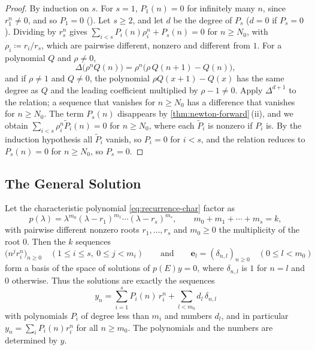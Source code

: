 \begin{proof}
By induction on $s$. For $s=1$, $P_1(n)=0$ for infinitely many $n$, since $r_1^n\ne0$, and so $P_1=0$ (). Let $s\ge2$, and let $d$ be the degree of $P_s$ ($d=0$ if $P_s=0$). Dividing by $r_s^n$ gives $\sum_{i<s}P_i(n)\rho_i^n+P_s(n)=0$ for $n\ge N_0$, with $\rho_i\coloneqq r_i/r_s$, which are pairwise different, nonzero and different from $1$. For a polynomial $Q$ and $\rho\ne0$,
\[
\Delta\bigl(\rho^nQ(n)\bigr)=\rho^n\bigl(\rho\,Q(n+1)-Q(n)\bigr),
\]
and if $\rho\ne1$ and $Q\ne0$, the polynomial $\rho Q(x+1)-Q(x)$ has the same degree as $Q$ and the leading coefficient multiplied by $\rho-1\ne0$. Apply $\Delta^{d+1}$ to the relation; a sequence that vanishes for $n\ge N_0$ has a difference that vanishes for $n\ge N_0$. The term $P_s(n)$ disappears by \cref{thm:newton-forward}\,(ii), and we obtain $\sum_{i<s}\rho_i^n\tilde P_i(n)=0$ for $n\ge N_0$, where each $\tilde P_i$ is nonzero if $P_i$ is. By the induction hypothesis all $\tilde P_i$ vanish, so $P_i=0$ for $i<s$, and the relation reduces to $P_s(n)=0$ for $n\ge N_0$, so $P_s=0$.
\end{proof}

\subsection{The General Solution}

\begin{theorem}
\label{thm:constant-coefficient-recurrences}
Let the characteristic polynomial \eqref{eq:recurrence-char} factor as
\[
p(\lambda)=\lambda^{m_0}(\lambda-r_1)^{m_1}\cdots(\lambda-r_s)^{m_s},\qquad m_0+m_1+\cdots+m_s=k,
\]
with pairwise different nonzero roots $r_1,\ldots,r_s$ and $m_0\ge0$ the multiplicity of the root $0$. Then the $k$ sequences
\[
\bigl(n^jr_i^n\bigr)_{n\ge0}\quad(1\le i\le s,\ 0\le j<m_i)\qquad\text{and}\qquad\mathbf e_l=(\delta_{n,l})_{n\ge0}\quad(0\le l<m_0)
\]
form a basis of the space of solutions of $p(E)y=0$, where $\delta_{n,l}$ is $1$ for $n=l$ and $0$ otherwise. Thus the solutions are exactly the sequences
\[
y_n=\sum_{i=1}^sP_i(n)\,r_i^n+\sum_{l<m_0}d_l\,\delta_{n,l}
\]
with polynomials $P_i$ of degree less than $m_i$ and numbers $d_l$, and in particular $y_n=\sum_iP_i(n)r_i^n$ for all $n\ge m_0$. The polynomials and the numbers are determined by $y$.
\end{theorem}

